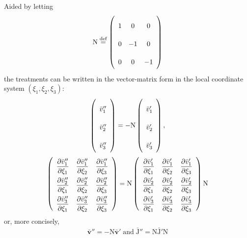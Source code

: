 \documentclass[a4paper,12pt,dvips]{article}
\newcommand*\defeq{\buildrel{\text{def}}\over{=}}
\begin{document}
Aided by letting
\begin{align*}
  \mathrm{N} \defeq \left(\begin{array}{ccc}
    1 & 0 & 0 \\ 0 & -1 & 0 \\ 0 & 0 & -1
  \end{array}\right)
\end{align*}
the treatments can be written in the vector-matrix form in the local coordinate
system $(\xi_1, \xi_2, \xi_3)$:
\begin{gather*}
  \left(\begin{array}{c}
    \bar{v}''_1 \\ \bar{v}''_2 \\ \bar{v}''_3
  \end{array}\right)
  = -\mathrm{N}
    \left(\begin{array}{c}
      \bar{v}'_1 \\ \bar{v}'_2 \\ \bar{v}'_3
    \end{array}\right),
  \\
  \renewcommand{\arraystretch}{2.2}
  \left(\begin{array}{ccc}
    \dfrac{\partial \bar{v}''_1}{\partial\xi_1} &
    \dfrac{\partial \bar{v}''_1}{\partial\xi_2} &
    \dfrac{\partial \bar{v}''_1}{\partial\xi_3} \\
    \dfrac{\partial \bar{v}''_2}{\partial\xi_1} &
    \dfrac{\partial \bar{v}''_2}{\partial\xi_2} &
    \dfrac{\partial \bar{v}''_2}{\partial\xi_3} \\
    \dfrac{\partial \bar{v}''_3}{\partial\xi_1} &
    \dfrac{\partial \bar{v}''_3}{\partial\xi_2} &
    \dfrac{\partial \bar{v}''_3}{\partial\xi_3}
  \end{array}\right)
  = \mathrm{N}
  \left(\begin{array}{ccc}
    \dfrac{\partial \bar{v}'_1}{\partial\xi_1} &
    \dfrac{\partial \bar{v}'_1}{\partial\xi_2} &
    \dfrac{\partial \bar{v}'_1}{\partial\xi_3} \\
    \dfrac{\partial \bar{v}'_2}{\partial\xi_1} &
    \dfrac{\partial \bar{v}'_2}{\partial\xi_2} &
    \dfrac{\partial \bar{v}'_2}{\partial\xi_3} \\
    \dfrac{\partial \bar{v}'_3}{\partial\xi_1} &
    \dfrac{\partial \bar{v}'_3}{\partial\xi_2} &
    \dfrac{\partial \bar{v}'_3}{\partial\xi_3}
  \end{array}\right)
  \mathrm{N}
\end{gather*}
or, more concisely,
\begin{align*}
  \bar{\mathbf{v}}'' = -\mathrm{N}\bar{\mathbf{v}}'
  \; \mbox{and} \;
  \bar{\mathrm{J}}'' = \mathrm{N\bar{J}'N}
\end{align*}
\end{document}
